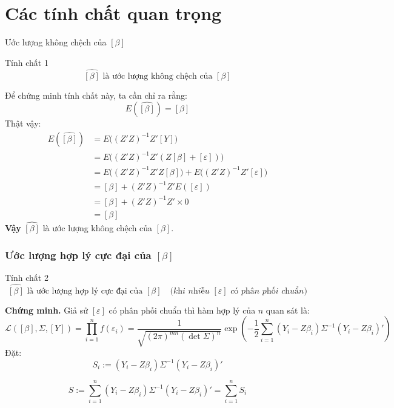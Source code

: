 \section{Các tính chất quan trọng}
\begin{frame}{Ước lượng không chệch của $[\beta]$}
\begin{block}{Tính chất 1}
\[
\boxed{
\widehat{[\beta]} \text{ là ước lượng không chệch của } [\beta]
}
\]
\end{block}

Để chứng minh tính chất này, ta cần chỉ ra rằng:
\[
E(\widehat{[\beta]}) = [\beta]
\]
Thật vậy:
\[
\begin{aligned}
E(\widehat{[\beta]})
&= E\big((Z'Z)^{-1}Z'[Y]\big) \\
&= E\big((Z'Z)^{-1}Z'(Z[\beta] + [\varepsilon])\big) \\
&= E\big((Z'Z)^{-1}Z'Z[\beta]\big) + E\big((Z'Z)^{-1}Z'[\varepsilon]\big) \\
&= [\beta] + (Z'Z)^{-1}Z'E([\varepsilon]) \\
&= [\beta] + (Z'Z)^{-1}Z' \times 0 \\
&= [\beta]
\end{aligned}
\]
\textbf{Vậy } $\widehat{[\beta]}$ là ước lượng không chệch của $[\beta]$.
\end{frame}

\begin{frame}
\frametitle{Ước lượng hợp lý cực đại của $[\beta]$}
\begin{block}{Tính chất 2}
\[
\boxed{
\widehat{[\beta]} \text{ là ước lượng hợp lý cực đại của } [\beta]
} \quad \textit{(khi nhiễu $[\varepsilon]$ có phân phối chuẩn)}
\]
\end{block}

\textbf{Chứng minh.}  
Giả sử $[\varepsilon]$ có phân phối chuẩn thì hàm hợp lý của $n$ quan sát là:
{\scriptsize\[
\mathcal{L}([\beta], \Sigma, [Y])
= \prod_{i=1}^{n} f(\varepsilon_i)
= \frac{1}{\sqrt{(2\pi)^{mn} (\det \Sigma)^{n}}}
\exp\!\left(
-\frac{1}{2} \sum_{i=1}^{n} (Y_i - Z\beta_i)\Sigma^{-1}(Y_i - Z\beta_i)'
\right)
\]}
Đặt:
\[
S_i := (Y_i - Z\beta_i)\Sigma^{-1}(Y_i - Z\beta_i)'
\]

\[
S := \sum_{i=1}^{n}(Y_i - Z\beta_i)\Sigma^{-1}(Y_i - Z\beta_i)'
= \sum_{i=1}^{n} S_i
\]
\end{frame}


